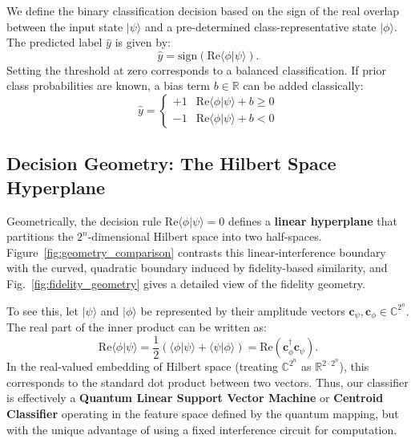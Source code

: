\documentclass[conference]{IEEEtran}
\begin{document}
We define the binary classification decision based on the sign of the real overlap between the input state $|\psi\rangle$ and a pre-determined class-representative state $|\phi\rangle$. The predicted label $\hat{y}$ is given by:
\begin{equation}
\hat{y} = \text{sign}\left( \mathrm{Re}\langle \phi | \psi \rangle \right).
\end{equation}
Setting the threshold at zero corresponds to a balanced classification. If prior class probabilities are known, a bias term $b \in \mathbb{R}$ can be added classically:
\begin{equation}
\hat{y} = \begin{cases} +1 & \mathrm{Re}\langle \phi | \psi \rangle + b \geq 0 \\ -1 & \mathrm{Re}\langle \phi | \psi \rangle + b < 0 \end{cases}
\end{equation}

\subsection{Decision Geometry: The Hilbert Space Hyperplane}

Geometrically, the decision rule $\mathrm{Re}\langle \phi | \psi \rangle = 0$ defines a \textbf{linear hyperplane} that partitions the $2^n$-dimensional Hilbert space into two half-spaces. Figure~\ref{fig:geometry_comparison} contrasts this linear-interference boundary with the curved, quadratic boundary induced by fidelity-based similarity, and Fig.~\ref{fig:fidelity_geometry} gives a detailed view of the fidelity geometry.

To see this, let $|\psi\rangle$ and $|\phi\rangle$ be represented by their amplitude vectors $\mathbf{c}_\psi, \mathbf{c}_\phi \in \mathbb{C}^{2^n}$. The real part of the inner product can be written as:
\begin{equation}
\mathrm{Re}\langle \phi | \psi \rangle = \frac{1}{2}\left( \langle \phi | \psi \rangle + \langle \psi | \phi \rangle \right) = \text{Re}(\mathbf{c}_\phi^\dagger \mathbf{c}_\psi).
\end{equation}
In the real-valued embedding of Hilbert space (treating $\mathbb{C}^{2^n}$ as $\mathbb{R}^{2 \cdot 2^n}$), this corresponds to the standard dot product between two vectors. Thus, our classifier is effectively a \textbf{Quantum Linear Support Vector Machine} or \textbf{Centroid Classifier} operating in the feature space defined by the quantum mapping, but with the unique advantage of using a fixed interference circuit for computation.
\end{document}
